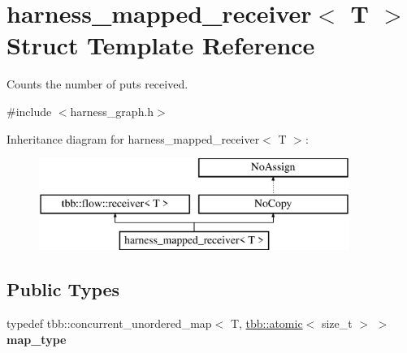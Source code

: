 \hypertarget{structharness__mapped__receiver}{}\section{harness\+\_\+mapped\+\_\+receiver$<$ T $>$ Struct Template Reference}
\label{structharness__mapped__receiver}


Counts the number of puts received.  




{\ttfamily \#include $<$harness\+\_\+graph.\+h$>$}

Inheritance diagram for harness\+\_\+mapped\+\_\+receiver$<$ T $>$\+:\begin{figure}[H]
\begin{center}
\leavevmode
\includegraphics[height=3.000000cm]{structharness__mapped__receiver}
\end{center}
\end{figure}
\subsection*{Public Types}
\begin{DoxyCompactItemize}
\item 
\hypertarget{structharness__mapped__receiver_af7581a6f98d140b4d704e857f3993aa1}{}typedef tbb\+::concurrent\+\_\+unordered\+\_\+map$<$ T, \hyperlink{structtbb_1_1atomic}{tbb\+::atomic}$<$ size\+\_\+t $>$ $>$ {\bfseries map\+\_\+type}\label{structharness__mapped__receiver_af7581a6f98d140b4d704e857f3993aa1}

\end{DoxyCompactItemize}
